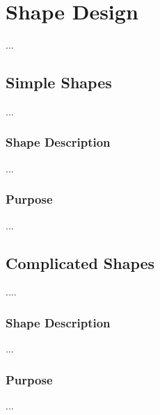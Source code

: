 \section{Shape Design}

...


\subsection{Simple Shapes}


...

\subsubsection{Shape Description}

...

\subsubsection{Purpose}

...

\subsection{Complicated Shapes}

....

\subsubsection{Shape Description}

...

\subsubsection{Purpose}

...
